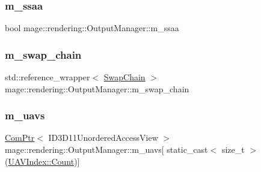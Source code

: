 \hypertarget{classmage_1_1rendering_1_1_output_manager_ae0016fada4d4550d58481d2c313ea524}{}\label{classmage_1_1rendering_1_1_output_manager_ae0016fada4d4550d58481d2c313ea524} 
\subsubsection{\texorpdfstring{m\+\_\+ssaa}{m\_ssaa}}
{\footnotesize\ttfamily bool mage\+::rendering\+::\+Output\+Manager\+::m\+\_\+ssaa\hspace{0.3cm}{\ttfamily [private]}}

\hypertarget{classmage_1_1rendering_1_1_output_manager_ac9cffc724a38ffd3d9b49475fd29d3ba}{}\label{classmage_1_1rendering_1_1_output_manager_ac9cffc724a38ffd3d9b49475fd29d3ba} 
\subsubsection{\texorpdfstring{m\+\_\+swap\+\_\+chain}{m\_swap\_chain}}
{\footnotesize\ttfamily std\+::reference\+\_\+wrapper$<$ \hyperlink{classmage_1_1rendering_1_1_swap_chain}{Swap\+Chain} $>$ mage\+::rendering\+::\+Output\+Manager\+::m\+\_\+swap\+\_\+chain\hspace{0.3cm}{\ttfamily [private]}}

\hypertarget{classmage_1_1rendering_1_1_output_manager_abfdf92e89ef4ee4df40204e84098fdd7}{}\label{classmage_1_1rendering_1_1_output_manager_abfdf92e89ef4ee4df40204e84098fdd7} 
\subsubsection{\texorpdfstring{m\+\_\+uavs}{m\_uavs}}
{\footnotesize\ttfamily \hyperlink{namespacemage_ae74f374780900893caa5555d1031fd79}{Com\+Ptr}$<$ I\+D3\+D11\+Unordered\+Access\+View $>$ mage\+::rendering\+::\+Output\+Manager\+::m\+\_\+uavs\mbox{[} static\+\_\+cast$<$ size\+\_\+t $>$(\hyperlink{classmage_1_1rendering_1_1_output_manager_a71b3797fef957312f92736f15b7ada3eae93f994f01c537c4e2f7d8528c3eb5e9}{U\+A\+V\+Index\+::\+Count})\mbox{]}\hspace{0.3cm}{\ttfamily [private]}}

